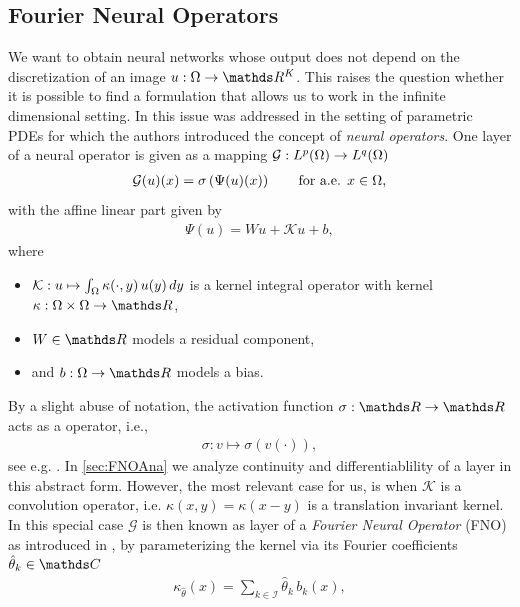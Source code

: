 \subsection{Fourier Neural Operators}
%
%
We want to obtain neural networks whose output does not depend on the discretization of an image $\img:\domain\to\R^K$. This raises the question whether it is possible to find a formulation that allows us to work in the infinite dimensional setting. In \cite{kovachki2021neural} this issue was addressed in the setting of parametric PDEs for which the authors introduced the concept of \emph{neural operators}. One layer of a neural operator is given as a mapping $\mathcal{G}:  L^p(\Omega) \rightarrow L^q(\Omega)$
%
\begin{align}\label{eq:layerdef}
\mathcal{G}(u)(x) = \sigma\left(\Psi(u)(x)\right) \qquad \text{for a.e. } x \in \Omega,
\end{align}
%
with the affine linear part given by
%
\begin{align}\label{eq:linearpart}
\Psi(u) = W u + \mathcal{K}u + b,
\end{align}
%
where
%
\begin{itemize}
\item $\mathcal{K}: u \mapsto \int_{\Omega} \kappa(\cdot, y)\, u(y)\,dy$ is a kernel integral operator with kernel $\kappa: \domain \times \domain \rightarrow \R$,
\item $W \in \R$ models a residual component,
\item and $b: \domain \rightarrow \R$ models a bias.
\end{itemize}
%
%
By a slight abuse of notation, the activation function $\sigma:\R\to\R$ acts as a \Nem{} operator, i.e.,
%
\begin{align}\label{eq:nemytskii}%
\sigma: v \mapsto \sigma(v(\cdot)),
\end{align}
%
see e.g. \cite{tröltzsch}. In \cref{sec:FNOAna} we analyze continuity and differentiablility of a layer in this abstract form. However, the most relevant case for us, is when $\mathcal{K}$ is a convolution operator, i.e. $\kappa(x,y)=\kappa(x-y)$ is a translation invariant kernel. In this special case $\mathcal{G}$ is then known as layer of a \emph{Fourier Neural Operator} (FNO) as introduced in \cite{li2020fourier}, by parameterizing the kernel via its Fourier coefficients $\hat{\param}_k\in\C$
%
\begin{align}\label{eq:fnokernel}
\kappa_{\hat{\theta}}(x) = \sum_{k \in \mathcal{I}} \hat{\theta}_k\, b_k(x),
\end{align}
